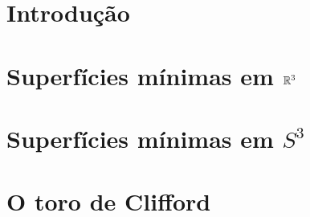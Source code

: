 \section{Introdução}

\section{Superfícies mínimas em $\mathbb{R}^3$}

\section{Superfícies mínimas em $S^3$}

\section{O toro de Clifford}